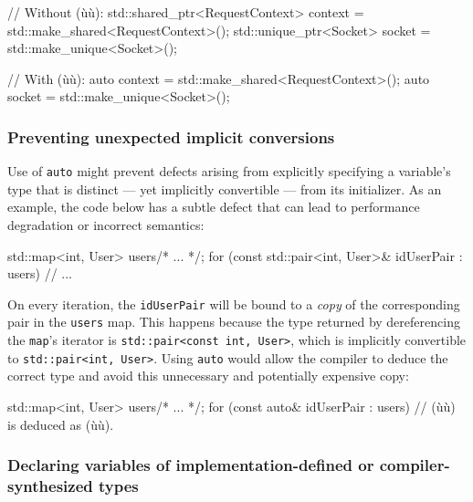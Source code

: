 \begin{emcppslisting}[language=C++]
// Without (ù{}ù):
std::shared_ptr<RequestContext> context = std::make_shared<RequestContext>();
std::unique_ptr<Socket>         socket  = std::make_unique<Socket>();

// With (ù{}ù):
auto context = std::make_shared<RequestContext>();
auto socket  = std::make_unique<Socket>();
\end{emcppslisting}
    

\subsubsection[Preventing unexpected implicit conversions]{Preventing unexpected implicit conversions}\label{preventing-unexpected-implicit-conversions}

Use of \lstinline!auto! might prevent defects arising from explicitly
specifying a variable's type that is distinct --- yet implicitly
convertible --- from its initializer. As an example, the code below has
a subtle defect that can lead to performance degradation or incorrect
semantics:

\begin{emcppslisting}[language=C++]
std::map<int, User> users{/* ... */};
for (const std::pair<int, User>& idUserPair : users)
{
    // ...
}
\end{emcppslisting}
    
\noindent On every iteration, the \lstinline!idUserPair! will be bound to a
\emph{copy} of the corresponding pair in the \lstinline!users! map. This
happens because the type returned by dereferencing the \lstinline!map!'s
iterator is \lstinline!std::pair<const!~\lstinline!int,!~\lstinline!User>!, which
is implicitly convertible to \lstinline!std::pair<int,!~\lstinline!User>!.
Using \lstinline!auto! would allow the compiler to deduce the correct type
and avoid this unnecessary and potentially expensive copy:

\begin{emcppslisting}[language=C++]
std::map<int, User> users{/* ... */};
for (const auto& idUserPair : users)
{
    // (ù{}ù) is deduced as (ù{}ù).
}
\end{emcppslisting}
    

\subsubsection[Declaring variables of implementation-defined or compiler-synthesized types]{Declaring variables of implementation-defined or compiler-synthesized types}\label{declaring-variables-of-implementation-defined-or-compiler-synthesized-types}

